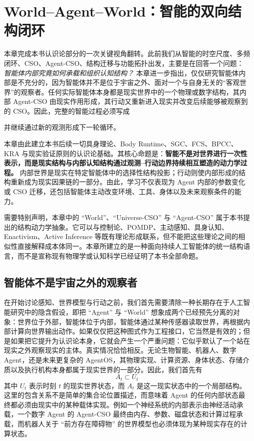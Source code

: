 \chapter{World--Agent--World：智能的双向结构闭环}

\begin{chapterlead}
本章完成本书认识论部分的一次关键视角翻转。此前我们从智能的时空尺度、多频闭环、CSO、Agent-CSO、结构迁移与功能拓扑出发，主要是在回答一个问题：\emph{智能体内部究竟如何承载和组织认知结构？} 本章进一步指出，仅仅研究智能体内部是不充分的，因为智能体并不是位于宇宙之外、面对一个与自身无关的“客观世界”的观察者。任何实际智能体本身都是现实世界中的一个物理或数字结构，其内部 Agent-CSO 由现实作用形成，其行动又重新进入现实并改变后续能够被观察到的 CSO。因此，完整的智能过程必须写成
\begin{statementbox}
\centering
{}
\end{statementbox}
并继续通过新的观测形成下一轮循环。

本章由此建立本书后续一切具身理论、Body Runtime、SGC、FCS、BPCC、KRA 与现实验证原则的认识论基础。其核心命题是：\textbf{智能不是对世界进行一次性表示，而是现实结构与内部认知结构通过观测--行动边界持续相互塑造的动力学过程。} 内部世界是现实在特定智能体中的选择性结构投影；行动则使内部形成的结构重新成为现实因果链的一部分。由此，学习不仅表现为 Agent 内部的参数变化或 CSO 迁移，还包括智能体主动改变环境、工具、身体以及未来观察条件的能力。

需要特别声明，本章中的 ``World''、``Universe-CSO'' 与 ``Agent-CSO'' 属于本书提出的结构动力学抽象。它可以与控制论、POMDP、主动感知、具身认知、Enactivism、Active Inference 等既有理论形成联系，但不能把这些理论之间的相似性直接解释成本体同一。本章所建立的是一种面向持续人工智能体的统一结构语言，而不是宣称现有物理学或认知科学已经证明了本书全部命题。
\end{chapterlead}

\section{智能体不是宇宙之外的观察者}

在开始讨论感知、世界模型与行动之前，我们首先需要清除一种长期存在于人工智能研究中的隐含假设，即把 ``Agent'' 与 ``World'' 想象成两个已经预先分离的对象：世界位于外部，智能体位于内部，智能体通过某种传感器读取世界，再根据内部计算向世界输出动作。如果仅仅把这种图式作为工程接口，它当然是有效的；但是如果把它提升为认识论本身，它就会产生一个严重问题：它似乎默认了一个站在现实之外观察现实的主体。真实情况恰恰相反。无论生物智能、机器人、数字 Agent，还是未来更复杂的 AgentOS，其物理实现、计算资源、身体状态、存储介质以及执行机构本身都属于现实世界的一部分。因此，我们首先有
\[
\boxed{
A_t \subset U_t
}
\]
其中 $U_t$ 表示时刻 $t$ 的现实世界状态，而 $A_t$ 是这一现实状态中的一个局部结构。这里的包含关系不是简单的集合论位置描述，而意味着 Agent 的任何内部状态最终都必须由现实中的某种载体实现。例如一个神经系统的内部表示由神经活动承载，一个数字 Agent 的 Agent-CSO 最终由内存、参数、磁盘状态和计算过程承载，而机器人关于 ``前方存在障碍物'' 的世界模型也必须体现为某种现实存在的计算状态。

